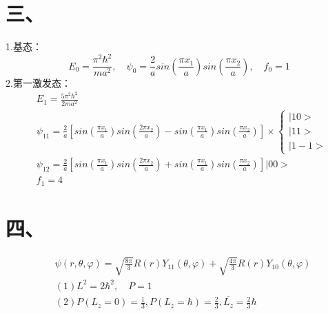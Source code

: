 \documentclass[UTF8]{ctexart}
\begin{document}
\section{三、}
1.基态：
\begin{equation*}
  E_0=\frac{\pi^2\hbar^2}{ma^2},\quad
  \psi_0=\frac{2}{a}sin(\frac{\pi x_1}{a})sin(\frac{\pi x_2}{a}),\quad
  f_0=1
\end{equation*}
2.第一激发态：
\begin{equation*}
  \begin{aligned}
     & E_1=\frac{5\pi^2\hbar^2}{2ma^2}                                     \\
     & \psi_{11}=\frac{2}{a}[sin(\frac{\pi x_1}{a})sin(\frac{2\pi x_2}{a})
      -sin(\frac{\pi x_1}{a})sin(\frac{\pi x_2}{a})]\times
    \begin{cases}
      \lvert10> \\
      \lvert11> \\
      \lvert1-1>
    \end{cases}                                             \\
     & \psi_{12}=\frac{2}{a}[sin(\frac{\pi x_1}{a})sin(\frac{2\pi x_2}{a})
    +sin(\frac{\pi x_1}{a})sin(\frac{\pi x_2}{a})]\lvert00>                \\
     & f_1=4
  \end{aligned}
\end{equation*}
\section*{四、}
\begin{equation*}
  \begin{aligned}
     & \psi(r,\theta,\varphi)=\sqrt{\frac{8\pi}{3}}R(r)Y_{11}(\theta,\varphi)+
    \sqrt{\frac{4\pi}{3}}R(r)Y_{10}(\theta,\varphi)                                     \\
     & (1)L^2=2\hbar^2,\quad P=1                                                        \\
     & (2)P(L_z=0)=\frac{1}{3},P(L_z=\hbar)=\frac{2}{3},\overline{L_z}=\frac{2}{3}\hbar
  \end{aligned}
\end{equation*}
\end{document}
